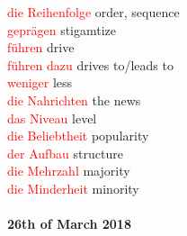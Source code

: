 \documentclass{article}
\begin{document}
\begin{multicols}{2}
	\textcolor{red}{die Reihenfolge} order, sequence \\ 
	\textcolor{red}{geprägen} stigamtize\\
	\textcolor{red}{führen} drive\\
	\textcolor{red}{führen dazu} drives to/leads to\\
	\textcolor{red}{weniger} less\\
	\textcolor{red}{die Nahrichten} the news \\
	\textcolor{red}{das Niveau} level \\
	\textcolor{red}{die Beliebtheit} popularity\\
	\textcolor{red}{der Aufbau} structure \\
	\textcolor{red}{die Mehrzahl} majority\\
	\textcolor{red}{die Minderheit} minority\\\\
	
	\textbf{26th of March 2018}\\\\
	

\end{multicols}
\end{document}
